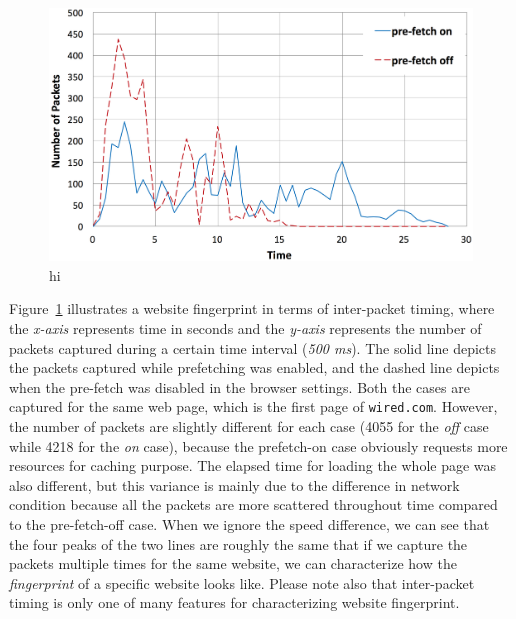 \begin{figure}[h]
\includegraphics[width=0.95\columnwidth]{figures/prefetch.png}
\centering
\caption{hi}
\label{fig:prefetch}
\end{figure}

Figure~\ref{fig:prefetch} illustrates a website fingerprint in terms of inter-packet timing, where the {\it x-axis} represents time in seconds and the {\it y-axis} represents the number of packets captured during a certain time interval ({\it 500 ms}).
The solid line depicts the packets captured while prefetching was enabled, and the dashed line depicts when the pre-fetch was disabled in the browser settings.
Both the cases are captured for the same web page, which is the first page of {\tt wired.com}.
However, the number of packets are slightly different for each case (4055 for the {\it off} case while 4218 for the {\it on} case), because the prefetch-on case obviously requests more resources for caching purpose. 
The elapsed time for loading the whole page was also different, but this variance is mainly due to the difference in network condition because all the packets are more scattered throughout time compared to the pre-fetch-off case.
When we ignore the speed difference, we can see that the four peaks of the two lines are roughly the same that if we capture the packets multiple times for the same website, we can characterize how the {\it fingerprint} of a specific website looks like.
Please note also that inter-packet timing is only one of many features for characterizing website fingerprint.



